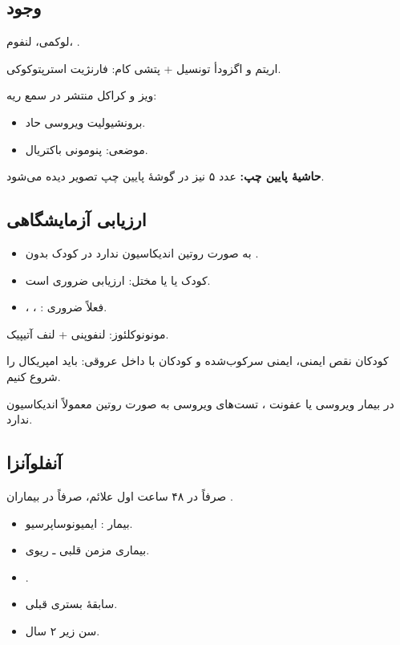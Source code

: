 \documentclass[12pt,a4paper]{article}
\begin{document}
\subsection*{وجود }
لوکمی، لنفوم، .

اریتم و اگزودأ تونسیل + پتشی کام: فارنژیت استرپتوکوکی.

ویز و کراکل منتشر در سمع ریه:
\begin{itemize}
\item برونشیولیت ویروسی حاد.
\item موضعی: پنومونی باکتریال.
\end{itemize}

\textbf{حاشیهٔ پایین چپ:} عدد ۵ نیز در گوشهٔ پایین چپ تصویر دیده می‌شود.

\subsection*{ارزیابی آزمایشگاهی}
\begin{itemize}
\item به صورت روتین اندیکاسیون ندارد در کودک  بدون .
\item کودک  یا  یا  مختل: ارزیابی  ضروری است.
\item {}، ، : فعلاً  ضروری.
\end{itemize}

مونونوکلئوز: لنفوپنی + لنف آتیپیک.

کودکان نقص ایمنی، ایمنی سرکوب‌شده و کودکان با  داخل عروقی:
باید  امپریکال را شروع کنیم.

در بیمار  ویروسی یا عفونت ، تست‌های ویروسی به صورت روتین معمولاً اندیکاسیون ندارد.

\subsection*{ آنفلوآنزا}
صرفاً در ۴۸ ساعت اول علائم، صرفاً در بیماران .
\begin{itemize}
\item بیمار : ایمیونوساپرسیو.
\item بیماری مزمن قلبی ـ ریوی.
\item {}.
\item سابقهٔ بستری قبلی.
\item سن زیر ۲ سال.
\end{itemize}
\end{document}
